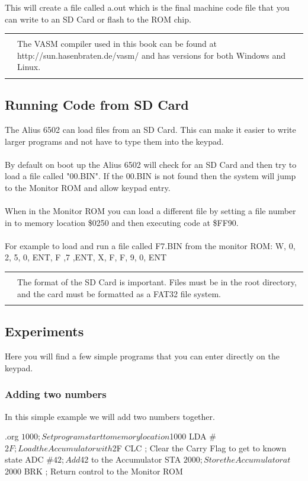 \documentclass{ol-softwaremanual}
\newcommand{\Note}[1]{
\begin{table}[h]
\begin{tabular}{|p{0.1\textwidth}p{0.8\textwidth}|}
\hline
 & \\
\multicolumn{1}{|r}{\Huge\warning} & #1\\
 &  \\ \hline
\end{tabular}
\end{table}
}
\begin{document}
This will create a file called a.out which is the final machine code file that you can write to an SD Card or flash to the ROM chip.\\

\Note{The VASM compiler used in this book can be found at http://sun.hasenbraten.de/vasm/ and has versions for both Windows and Linux.}

\pagebreak

\subsection{Running Code from SD Card}
The Alius 6502 can load files from an SD Card. This can make it easier to write larger programs and not have to type them into the keypad.\\
\\
By default on boot up the Alius 6502 will check for an SD Card and then try to load a file called "00.BIN". If the 00.BIN is not found then the system will jump to the Monitor ROM and allow keypad entry.\\
\\
When in the Monitor ROM you can load a different file by setting a file number in to memory location \$0250 and then executing code at \$FF90.\\
\\
For example to load and run a file called F7.BIN from the monitor ROM:
W, 0, 2, 5, 0, ENT, F ,7 ,ENT, X, F, F, 9, 0, ENT\\

\Note{The format of the SD Card is important. Files must be in the root directory, and the card must be formatted as a FAT32 file system.}
\pagebreak

\subsection{Experiments}
Here you will find a few simple programs that you can enter directly on the keypad.\\

\subsubsection{Adding two numbers}
In this simple example we will add two numbers together.
\begin{ffcode}
.org $1000         ; Set program start to memory location $1000
    LDA #$2F       ; Load the Accumulator with $2F
    CLC            ; Clear the Carry Flag to get to known state
    ADC #$42       ; Add $42 to the Accumulator 
    STA $2000      ; Store the Accumulator at $2000
    BRK            ; Return control to the Monitor ROM
\end{ffcode}
\end{document}
